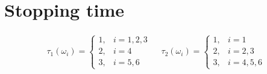 \documentclass[12pt]{article}
\begin{document}
\section{Stopping time}
\begin{align*}
    \tau_1(\omega_i)=\begin{cases}
        1, & i = 1, 2, 3\\
        2, & i = 4\\
        3, & i = 5, 6
    \end{cases}\quad\ 
    \tau_2(\omega_i)=\begin{cases}
        1, & i = 1\\
        2, & i = 2, 3\\
        3, & i = 4, 5, 6
    \end{cases}
\end{align*}
\end{document}
